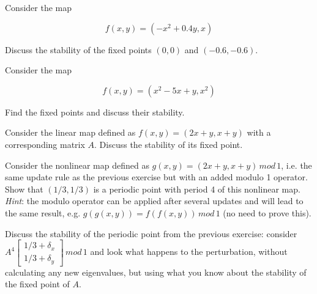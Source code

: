 \pagebreak

\begin{exer}
Consider the map 

$$f(x,y) = (-x^2+0.4y, x)$$

Discuss the stability of the fixed points $(0,0)$ and $(-0.6,-0.6)$.

\end{exer}

\begin{exer}
Consider the map 

$$f(x,y) = (x^2-5x+y, x^2)$$

Find the fixed points and discuss their stability.
\end{exer}


\begin{exer}
Consider the linear map defined as $f(x,y) = (2x+y, x+y)$ with a corresponding matrix $A$. Discuss the stability of its fixed point.
\end{exer}

\begin{exer}
Consider the nonlinear map defined as $g(x,y) = (2x+y, x+y)\, mod \, 1$, i.e. the same update rule as the previous exercise but with an added modulo 1 operator. Show that $(1/3, 1/3)$ is a periodic point with period 4 of this nonlinear map.\\

\textit{Hint}: the modulo operator can be applied after several updates and will lead to the same result, e.g.  $g(g(x,y)) = f(f(x,y)) \, mod \, 1$ (no need to prove this).
\end{exer}

\begin{exer}
Discuss the stability of the periodic point from the previous exercise: consider $A^4 \begin{bmatrix} 1/3 + \delta_x \\ 1/3 + \delta_y \end{bmatrix} \, mod \, 1$ and look what happens to the perturbation, without calculating any new eigenvalues, but using what you know about the stability of the fixed point of $A$.
\end{exer}


